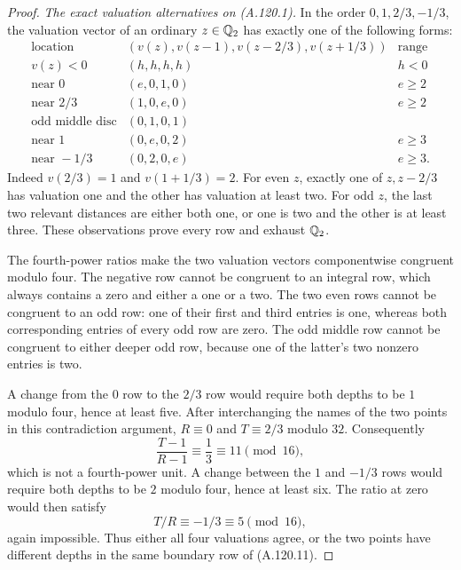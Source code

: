 \begin{proof}
\emph{The exact valuation alternatives on (A.120.1).}
In the order $0,1,2/3,-1/3$, the valuation vector of an
ordinary $z\in\mathbb Q_2$ has exactly one of the following forms:
\[
\begin{array}{c|c|c}
\text{location}&(v(z),v(z-1),v(z-2/3),v(z+1/3))
                                      &\text{range}\\ \hline
v(z)<0&(h,h,h,h)&h<0\\
\text{near }0&(e,0,1,0)&e\ge2\\
\text{near }2/3&(1,0,e,0)&e\ge2\\
\text{odd middle disc}&(0,1,0,1)&\\
\text{near }1&(0,e,0,2)&e\ge3\\
\text{near }-1/3&(0,2,0,e)&e\ge3.
\end{array}
\tag{A.120.11}
\]
Indeed $v(2/3)=1$ and $v(1+1/3)=2$.
For even $z$, exactly one of $z,z-2/3$ has valuation one
and the other has valuation at least two.
For odd $z$, the last two relevant distances are either
both one, or one is two and the other is at least three.
These observations prove every row and exhaust $\mathbb Q_2$.

The fourth-power ratios make the two valuation vectors
componentwise congruent modulo four.
The negative row cannot be congruent to an integral row,
which always contains a zero and either a one or a two.
The two even rows cannot be congruent to an odd row:
one of their first and third entries is one, whereas
both corresponding entries of every odd row are zero.
The odd middle row cannot be congruent to either deeper
odd row, because one of the latter's two nonzero entries
is two.

A change from the $0$ row to the $2/3$ row would require
both depths to be $1$ modulo four, hence at least five.
After interchanging the names of the two points in this
contradiction argument, $R\equiv0$ and $T\equiv2/3$
modulo $32$.
Consequently
\[
       \frac{T-1}{R-1}\equiv\frac13\equiv11\pmod{16},
\tag{A.120.12}
\]
which is not a fourth-power unit.
A change between the $1$ and $-1/3$ rows would require
both depths to be $2$ modulo four, hence at least six.
The ratio at zero would then satisfy
\[
                         T/R\equiv-1/3\equiv5\pmod{16},
\tag{A.120.13}
\]
again impossible.
Thus either all four valuations agree, or the two points
have different depths in the same boundary row of
(A.120.11).


\end{proof}
